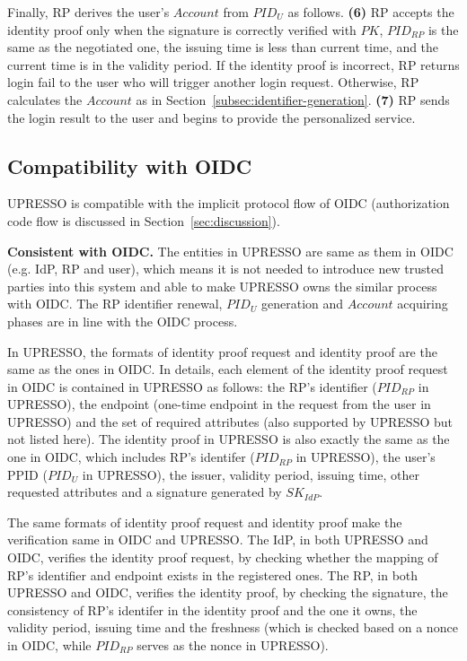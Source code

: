 Finally, RP derives the user's  $Account$ from $PID_U$ as follows. \textbf{(6)} RP accepts the identity proof only when the signature is correctly verified with $PK$, $PID_{RP}$ is the same as the negotiated one, the issuing time is less than current time, and the current time is in the validity period. If the identity proof is incorrect, RP returns login fail to the user who will trigger another login request. Otherwise, RP calculates the $Account$ as in Section~\ref{subsec:identifier-generation}. \textbf{(7)} RP sends the login result to the user and begins to provide the personalized service.


\subsection{Compatibility with OIDC}
\label{subsec:compatible}
UPRESSO is compatible with the implicit protocol flow of OIDC (authorization code flow is discussed in Section~\ref{sec:discussion}).

\vspace{1mm}\noindent \textbf{Consistent with OIDC.} 
The entities in UPRESSO are same as them in OIDC (e.g. IdP, RP and user), which means it is not needed to introduce new trusted parties into this system and able to make UPRESSO owns the similar process with OIDC. The RP identifier renewal, $PID_U$ generation and $Account$ acquiring phases are in line with the OIDC process.

In UPRESSO, the formats of identity proof request and identity proof are the same as the ones in OIDC. In details, each element of the identity proof request in OIDC is contained in UPRESSO as follows: the RP's identifier ($PID_{RP}$ in UPRESSO), the endpoint (one-time endpoint in the request from the user in UPRESSO) and the set of required attributes (also supported by UPRESSO but not listed here). The identity proof in UPRESSO is also exactly the same as the one in OIDC, which includes RP's identifer ($PID_{RP}$ in UPRESSO), the user's PPID ($PID_U$ in UPRESSO), the issuer, validity period, issuing time, other requested attributes and a signature generated by $SK_{IdP}$.

The same formats of identity proof request and identity proof make the verification same in OIDC and UPRESSO. The IdP, in both UPRESSO and OIDC, verifies the identity proof request, by checking whether the mapping of RP's identifier and endpoint exists in the registered ones. The RP, in both UPRESSO and OIDC, verifies the identity proof, by checking the signature, the consistency of RP's identifer in the identity proof and the one it owns, the validity period, issuing time and the freshness (which is checked based on a nonce in  OIDC, while  $PID_{RP}$ serves as the nonce in UPRESSO).

